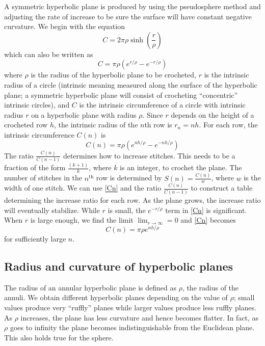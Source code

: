 \documentclass[letterpaper,titlepage]{article}
\begin{document}
A symmetric hyperbolic plane is produced by using the pseudosphere method and adjusting the rate of increase to be sure the surface will have constant negative curvature. We begin with the equation
\begin{equation}
C = 2 \pi \rho \sinh \left( \frac{r}{\rho} \right)
\label{Csinh}
\end{equation}
which can also be written as
\begin{equation}
C = \pi \rho \left( e^{r/\rho} - e^{-r/\rho} \right)
\label{Ce}
\end{equation}
where $\rho$ is the radius of the hyperbolic plane to be crocheted, $r$ is the intrinsic radius of a circle (intrinsic meaning measured along the surface of the hyperbolic plane; a symmetric hyperbolic plane will consist of crocheting ``concentric'' intrinsic circles), and $C$ is the intrinsic circumference of a circle with intrinsic radius $r$ on a hyperbolic plane with radius $\rho$.
Since $r$ depends on the height of a crocheted row $h$, the intrinsic radius of the $n$th row is $r_n = nh$.
For each row, the intrinsic circumference $C(n)$ is
\begin{equation}
C(n) = \pi \rho \left( e^{nh/\rho} - e^{-nh/\rho} \right)
\label{Cn}
\end{equation}
The ratio $\frac{C(n)}{C(n-1)}$ determines how to increase stitches.
This needs to be a fraction of the form $\frac{(k+1)}{k}$, where $k$ is an integer, to crochet the plane.
The number of stitches in the $n^{\text{th}}$ row is determined by $S(n) = \frac{C(n)}{w}$, where $w$ is the width of one stitch.
We can use \eqref{Cn} and the ratio $\frac{C(n)}{C(n-1)}$ to construct a table determining the increase ratio for each row.
As the plane grows, the increase ratio will eventually stabilize.
While $r$ is small, the $e^{-r/\rho}$ term in \eqref{Cn} is significant.
When $r$ is large enough, we find the limit $\lim_{r \to \infty} = 0$ and \eqref{Cn} becomes
\begin{equation}
C(n) = \pi \rho e^{nh/\rho}
\end{equation}
for sufficiently large $n$.

\subsection{Radius and curvature of hyperbolic planes}
\label{hradius}
The radius of an annular hyperbolic plane is defined as $\rho$, the radius of the annuli.
We obtain different hyperbolic planes depending on the value of $\rho$; small values produce very ``ruffly'' planes while larger values produce less ruffly planes.
As $\rho$ increases, the plane has less curvature and hence becomes flatter.
In fact, as $\rho$ goes to infinity the plane becomes indistinguishable from the Euclidean plane.
This also holds true for the sphere.
\end{document}
